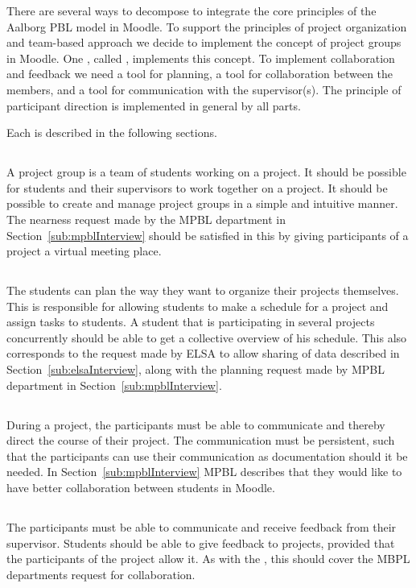 There are several ways to decompose \system{} to integrate the core principles of the Aalborg PBL model in Moodle. 
To support the principles of project organization and team-based approach we decide to implement the concept of project groups in Moodle. 
One \subsystem{}, called \administrationgroup{}, implements this concept.
To implement collaboration and feedback we need a tool for planning, a tool for collaboration between the members, and a tool for communication with the supervisor(s). 
The principle of participant direction is implemented in general by all parts. 

Each \subsystem{} is described in the following sections.

\subsection{\administrationgroup{}} %
\label{sec:admgroupdecom}
A project group is a team of students working on a project.
It should be possible for students and their supervisors to work together on a project.
It should be possible to create and manage project groups in a simple and intuitive manner.
The nearness request made by the MPBL department in Section~\ref{sub:mpblInterview} should be satisfied in this \subsystem{} by giving participants of a project a virtual meeting place.

\subsection{\timelinegroup{}} %
\label{sec:tmlgroupdecom}
The students can plan the way they want to organize their projects themselves.
This \subsystem{} is responsible for allowing students to make a schedule for a project and assign tasks to students.
A student that is participating in several projects concurrently should be able to get a collective overview of his schedule.
This also corresponds to the request made by ELSA to allow sharing of data described in Section~\ref{sub:elsaInterview}, along with the planning request made by MPBL department in Section~\ref{sub:mpblInterview}.

\subsection{\blackboardgroup{}} %
During a project, the participants must be able to communicate and thereby direct the course of their project.
The communication must be persistent, such that the participants can use their communication as documentation should it be needed.
In Section~\ref{sub:mpblInterview} MPBL describes that they would like to have better collaboration between students in Moodle.

\subsection{\supervisorgroup{}} %
The participants must be able to communicate and receive feedback from their supervisor.
Students should be able to give feedback to projects, provided that the participants of the project allow it.
As with the \blackboardgroup{} \subsystem{}, this \subsystem{} should cover the MBPL departments request for collaboration.


